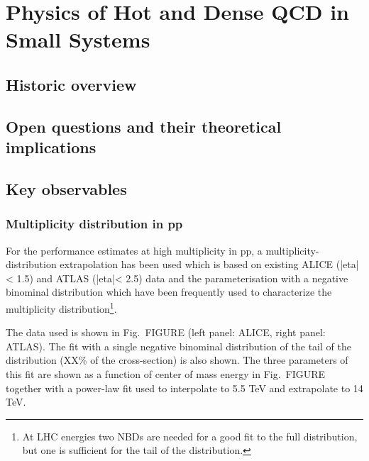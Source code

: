 \documentclass[../report.tex]{subfiles}
\begin{document}
\section{Physics of Hot and Dense QCD in Small Systems}

\subsection{Historic overview}

\subsection{Open questions and their theoretical implications}


\subsection{Key observables}

\subsubsection{Multiplicity distribution in pp}

For the performance estimates at high multiplicity in pp, a multiplicity-distribution extrapolation has been used which is based on existing ALICE (|eta| < 1.5) and ATLAS (|eta|< 2.5) data and the parameterisation with a negative binominal distribution which have been frequently used to characterize the multiplicity distribution\footnote{At LHC energies two NBDs are needed for a good fit to the full distribution, but one is sufficient for the tail of the distribution.}.

The data used is shown in Fig.~FIGURE (left panel: ALICE, right panel: ATLAS). The fit with a single negative binominal distribution of the tail of the distribution (XX\% of the cross-section) is also shown. The three parameters of this fit are shown as a function of center of mass energy in Fig.~FIGURE together with a power-law fit used to interpolate to 5.5 TeV and extrapolate to 14 TeV.
\end{document}
